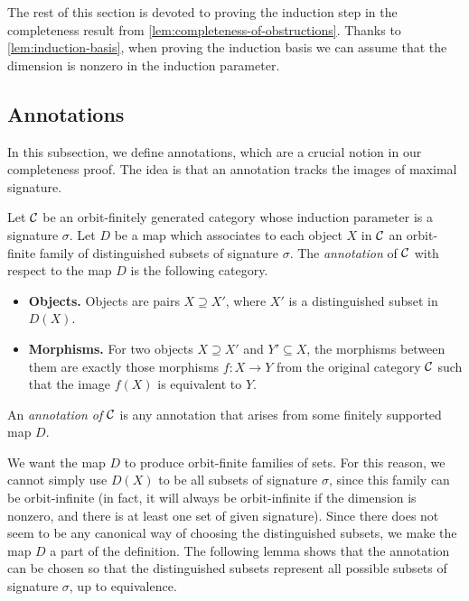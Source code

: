 The rest of this section is devoted to proving the induction step in the completeness result from \cref{lem:completeness-of-obstructions}.
Thanks to \cref{lem:induction-basis}, when proving the induction basis we can assume that the dimension is nonzero in the induction parameter.

\subsection{Annotations}
\label{sec:annotations}
In this subsection, we define annotations, which are a crucial notion in our completeness proof.  The idea is that an annotation tracks  the images of maximal signature.




\begin{definition}[Annotation] 
            Let ${\mathcal C}$ be an orbit-finitely generated category whose induction parameter is a signature $\sigma$. Let $D$ be a map which associates to each object $X$ in ${\mathcal C}$ an orbit-finite family of distinguished  subsets of signature $\sigma$.
            The \emph{annotation} of ${\mathcal C}$ with respect to the map $D$ is the following category.
    \begin{itemize}
    \item \textbf{Objects.} Objects are pairs $X \supseteq X'$, where $X'$ is a distinguished subset in $D(X)$.
    \item \textbf{Morphisms.} For two objects  $X \supseteq X'$ and $Y' \subseteq X$, the morphisms between them  are exactly those morphisms $f : X \to Y$ from the original category ${\mathcal C}$ such that 
    the image $f(X)$ is equivalent to $Y$.
\end{itemize}
An \emph{annotation of ${\mathcal C}$} is any annotation that arises from some finitely supported map $D$.
 \end{definition}

 We want the map $D$ to produce orbit-finite families of sets. For this reason, we cannot simply use $D(X)$ to be all subsets of signature $\sigma$, since this family can be orbit-infinite (in fact, it will always be orbit-infinite if the dimension is nonzero, and there is at least one set of given signature). Since there does not seem to be any canonical way of choosing the distinguished subsets, we make the map $D$ a part of the definition.  The following lemma shows that the annotation can be chosen so that the distinguished subsets represent all possible subsets of signature $\sigma$, up to equivalence.

